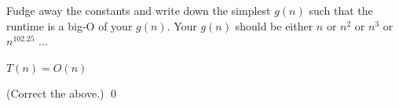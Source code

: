 \nextq
Fudge away the constants and write down the simplest $g(n)$ such
that the runtime is a big-O of your $g(n)$.
Your $g(n)$ should be either $n$ or $n^2$ or $n^3$ or $n^{102.25}$ ...
\\
\ANSWER
\begin{answerlong}
$T(n) = O(n)$
\end{answerlong}
(Correct the above.)
\qed


